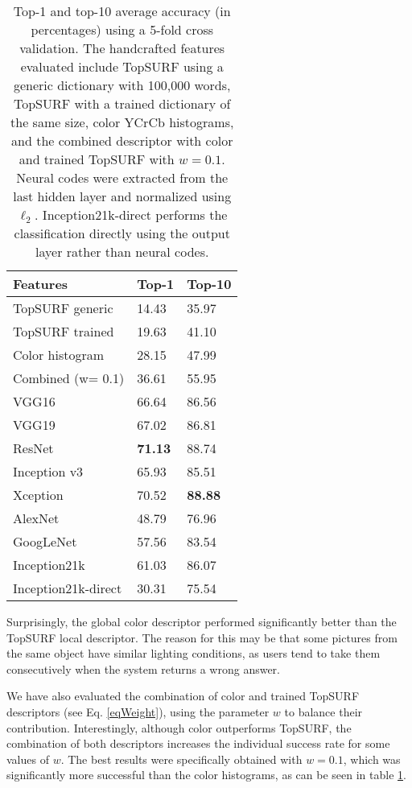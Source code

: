 \documentclass[final, twocolumn]{elsarticle}
\begin{document}
\begin{table}
\centering
\begin{tabular}{l|ll}
\hline
\textbf{Features} 	& \textbf{Top-1} & \textbf{Top-10} \\ \hline
TopSURF generic 	& 14.43 		&35.97 \\
TopSURF trained 	& 19.63 		& 41.10 \\
Color histogram 	& 28.15 		&47.99 \\
Combined (w= 0.1) 	& 36.61 		& 55.95 \\ \hline
VGG16				& 66.64 		&86.56 \\
VGG19				& 67.02 		&86.81 \\
ResNet				& \textbf{71.13} & 88.74 \\
Inception v3		& 65.93 		&85.51 \\
Xception			& 70.52 		& \textbf{88.88} \\
AlexNet				& 48.79 		&76.96 \\
GoogLeNet			& 57.56 		&83.54 \\
Inception21k 		& 61.03 		&86.07 \\
Inception21k-direct & 30.31 		& 75.54 \\
\hline
\end{tabular}
\caption{Top-1 and top-10 average accuracy (in percentages) using a 5-fold cross validation. The handcrafted features evaluated include TopSURF using a generic dictionary with 100,000 words, TopSURF with a trained dictionary of the same size, color YCrCb histograms, and the combined descriptor with color and trained TopSURF with $w=0.1$. Neural codes were extracted from the last hidden layer and normalized using $\ell_2$. Inception21k-direct performs the classification directly using the output layer rather than neural codes.}
\label{Tab2}
\end{table}

Surprisingly, the global color descriptor performed significantly better than the TopSURF local descriptor. The reason for this may be that some pictures from the same object have similar lighting conditions, as users tend to take them consecutively when the system returns a wrong answer. 

We have also evaluated the combination of color and trained TopSURF descriptors (see Eq. \ref{eqWeight}), using the parameter $w$ to balance their contribution. Interestingly, although color outperforms TopSURF, the  combination of both descriptors increases the individual  success rate for some values of $w$. The best results were specifically obtained with $w=0.1$, which was significantly more successful than the color histograms, as can be seen in table \ref{Tab2}. 
\end{document}
